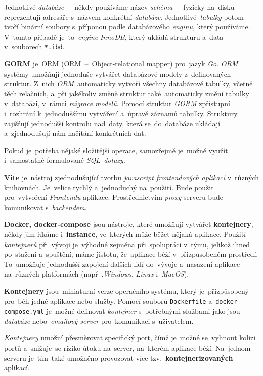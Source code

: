 \documentclass[11pt,a4paper]{report}
\begin{document}
            Jednotlivé \emph{databáze}~--~někdy používáme název \emph{schéma}~--~fyzicky na~disku reprezentují adresáře s~názvem konkrétní \emph{databáze}. Jednotlivé~\emph{tabulky} potom tvoří binární soubory s~příponou podle databázového \emph{enginu}, který používáme. V~tomto případě je~to~\emph{engine} \emph{InnoDB}, který ukládá strukturu a~data v~souborech \texttt{*.ibd}. \cite{MySQLInnoDB}
            
            \textbf{GORM} je~ORM (ORM~--~Object-relational mapper) pro~jazyk \emph{Go}. \emph{ORM} systémy umožňují jednoduše vytvářet databázové modely z~definovaných struktur. Z~nich \emph{ORM}~automaticky vytvoří všechny databázové tabulky, včetně těch relačních, a~při jakékoliv změně struktur také~automaticky změní tabulky v~databázi, v~rámci \emph{migrace modelů}. Pomocí struktur \emph{GORM} zpřístupní i~rozhrání k~jednoduššímu vytváření a~úpravě záznamů tabulky. Struktury zajišťují jednodušší kontrolu nad~daty, která se~do~databáze ukládají a~zjednodušují nám načítání konkrétních dat.

            Pokud je~potřeba nějaké složitější operace, samozřejmě je~možné využít i~samostatně formulované \emph{SQL~dotazy}. \cite{gormGORM, freecodecamp:orm}

            \textbf{Vite} je~nástroj zjednodušující tvorbu \emph{javascript frontendových aplikací} v~různých knihovnách. Je~velice rychlý a~jednoduchý na~použití. Bude použit pro~vytvoření \emph{Frontendu} aplikace. Prostřednictvím \emph{proxy} serveru bude komunikovat s~\emph{backendem}.

            \textbf{Docker, docker-compose} jsou nástroje, které umožňují vytvářet \textbf{kontejnery}, někdy jim říkáme i~\textbf{instance}, ve~kterých může běžet nějaká aplikace. Použití \emph{kontejnerů} při~vývoji je~výhodné zejména při~spolupráci v~týmu, jelikož ihned po~stažení a~spuštění, máme jistotu, že~aplikace běží v~přizpůsobeném prostředí. To~umožňuje jednodušší zapojení dalších lidí do~vývoje a~nasazení aplikace na~různých platformách (např~.\emph{Windows}, \emph{Linux} i~\emph{MacOS}).

            \textbf{Kontejnery} jsou~miniaturní verze operačního systému, který je~přizpůsobený pro~běh jedné aplikace nebo služby. Pomocí souborů \texttt{Dockerfile} a~\texttt{docker-compose.yml} je~možné definovat \emph{kontejner} s~potřebnými službami jako jsou \emph{databáze} nebo~\emph{emailový server} pro~komunikaci s~uživatelem.

            \emph{Kontejnery} umožní přesměrovat specifický port, čímž je~možné se~vyhnout kolizi portů a~snižuje~se riziko útoku na~server, na~kterém aplikace běží. Na~jednom serveru je~tím~také umožněno provozovat více tzv.~\textbf{kontejnerizovaných} aplikací. \cite{docker, dockernginxperformance}
\end{document}
